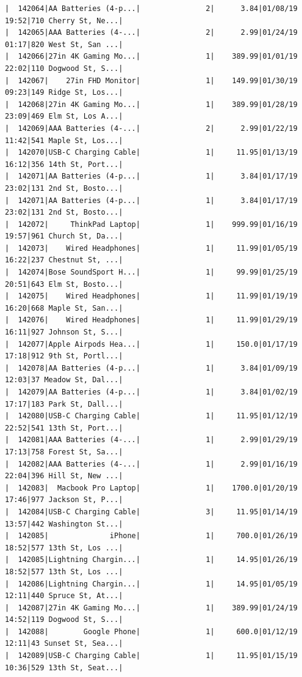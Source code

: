 \documentclass[
  letterpaper,
  DIV=11,
  numbers=noendperiod]{scrartcl}
\begin{document}
\begin{verbatim}
|  142064|AA Batteries (4-p...|               2|      3.84|01/08/19 19:52|710 Cherry St, Ne...|
|  142065|AAA Batteries (4-...|               2|      2.99|01/24/19 01:17|820 West St, San ...|
|  142066|27in 4K Gaming Mo...|               1|    389.99|01/01/19 22:02|110 Dogwood St, S...|
|  142067|    27in FHD Monitor|               1|    149.99|01/30/19 09:23|149 Ridge St, Los...|
|  142068|27in 4K Gaming Mo...|               1|    389.99|01/28/19 23:09|469 Elm St, Los A...|
|  142069|AAA Batteries (4-...|               2|      2.99|01/22/19 11:42|541 Maple St, Los...|
|  142070|USB-C Charging Cable|               1|     11.95|01/13/19 16:12|356 14th St, Port...|
|  142071|AA Batteries (4-p...|               1|      3.84|01/17/19 23:02|131 2nd St, Bosto...|
|  142071|AA Batteries (4-p...|               1|      3.84|01/17/19 23:02|131 2nd St, Bosto...|
|  142072|     ThinkPad Laptop|               1|    999.99|01/16/19 19:57|961 Church St, Da...|
|  142073|    Wired Headphones|               1|     11.99|01/05/19 16:22|237 Chestnut St, ...|
|  142074|Bose SoundSport H...|               1|     99.99|01/25/19 20:51|643 Elm St, Bosto...|
|  142075|    Wired Headphones|               1|     11.99|01/19/19 16:20|668 Maple St, San...|
|  142076|    Wired Headphones|               1|     11.99|01/29/19 16:11|927 Johnson St, S...|
|  142077|Apple Airpods Hea...|               1|     150.0|01/17/19 17:18|912 9th St, Portl...|
|  142078|AA Batteries (4-p...|               1|      3.84|01/09/19 12:03|37 Meadow St, Dal...|
|  142079|AA Batteries (4-p...|               1|      3.84|01/02/19 17:17|183 Park St, Dall...|
|  142080|USB-C Charging Cable|               1|     11.95|01/12/19 22:52|541 13th St, Port...|
|  142081|AAA Batteries (4-...|               1|      2.99|01/29/19 17:13|758 Forest St, Sa...|
|  142082|AAA Batteries (4-...|               1|      2.99|01/16/19 22:04|396 Hill St, New ...|
|  142083|  Macbook Pro Laptop|               1|    1700.0|01/20/19 17:46|977 Jackson St, P...|
|  142084|USB-C Charging Cable|               3|     11.95|01/14/19 13:57|442 Washington St...|
|  142085|              iPhone|               1|     700.0|01/26/19 18:52|577 13th St, Los ...|
|  142085|Lightning Chargin...|               1|     14.95|01/26/19 18:52|577 13th St, Los ...|
|  142086|Lightning Chargin...|               1|     14.95|01/05/19 12:11|440 Spruce St, At...|
|  142087|27in 4K Gaming Mo...|               1|    389.99|01/24/19 14:52|119 Dogwood St, S...|
|  142088|        Google Phone|               1|     600.0|01/12/19 12:11|43 Sunset St, Sea...|
|  142089|USB-C Charging Cable|               1|     11.95|01/15/19 10:36|529 13th St, Seat...|

\end{verbatim}
\end{document}
